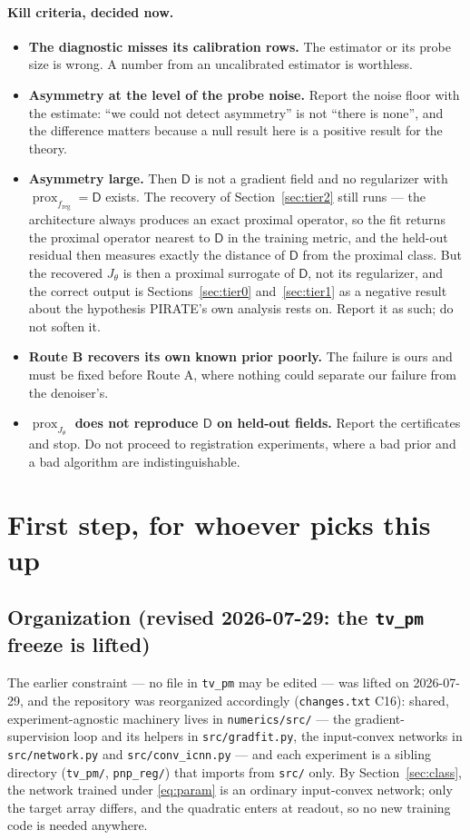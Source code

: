 \documentclass[11pt]{article}
\theoremstyle{definition}
\newcommand{\D}{\mathsf{D}}
\newcommand{\freg}{f_{\mathrm{reg}}}
\newcommand{\prox}{\operatorname{prox}}
\newcommand{\code}[1]{\texttt{#1}}
\begin{document}
\paragraph{Kill criteria, decided now.}
\begin{itemize}
\item \textbf{The diagnostic misses its calibration rows.} The estimator or its probe size is wrong. A number from an uncalibrated estimator is worthless.
\item \textbf{Asymmetry at the level of the probe noise.} Report the noise floor with the estimate: ``we could not detect asymmetry'' is not ``there is none'', and the difference matters because a null result here is a positive result for the theory.
\item \textbf{Asymmetry large.} Then $\D$ is not a gradient field and no regularizer with $\prox_{\freg} = \D$ exists. The recovery of Section~\ref{sec:tier2} still runs — the architecture always produces an exact proximal operator, so the fit returns the proximal operator nearest to $\D$ in the training metric, and the held-out residual then measures exactly the distance of $\D$ from the proximal class. But the recovered $J_\theta$ is then a proximal surrogate of $\D$, not its regularizer, and the correct output is Sections~\ref{sec:tier0} and~\ref{sec:tier1} as a negative result about the hypothesis PIRATE's own analysis rests on. Report it as such; do not soften it.
\item \textbf{Route B recovers its own known prior poorly.} The failure is ours and must be fixed before Route A, where nothing could separate our failure from the denoiser's.
\item \textbf{$\prox_{J_\theta}$ does not reproduce $\D$ on held-out fields.} Report the certificates and stop. Do not proceed to registration experiments, where a bad prior and a bad algorithm are indistinguishable.
\end{itemize}

\section{First step, for whoever picks this up}
\label{sec:first}

\subsection{Organization (revised 2026-07-29: the \texttt{tv\_pm} freeze is lifted)}

The earlier constraint — no file in \code{tv\_pm} may be edited — was lifted on 2026-07-29, and the repository was reorganized accordingly (\code{changes.txt} C16): shared, experiment-agnostic machinery lives in \code{numerics/src/} — the gradient-supervision loop and its helpers in \code{src/gradfit.py}, the input-convex networks in \code{src/network.py} and \code{src/conv\_icnn.py} — and each experiment is a sibling directory (\code{tv\_pm/}, \code{pnp\_reg/}) that imports from \code{src/} only. By Section~\ref{sec:class}, the network trained under \eqref{eq:param} is an ordinary input-convex network; only the target array differs, and the quadratic enters at readout, so no new training code is needed anywhere.
\end{document}
